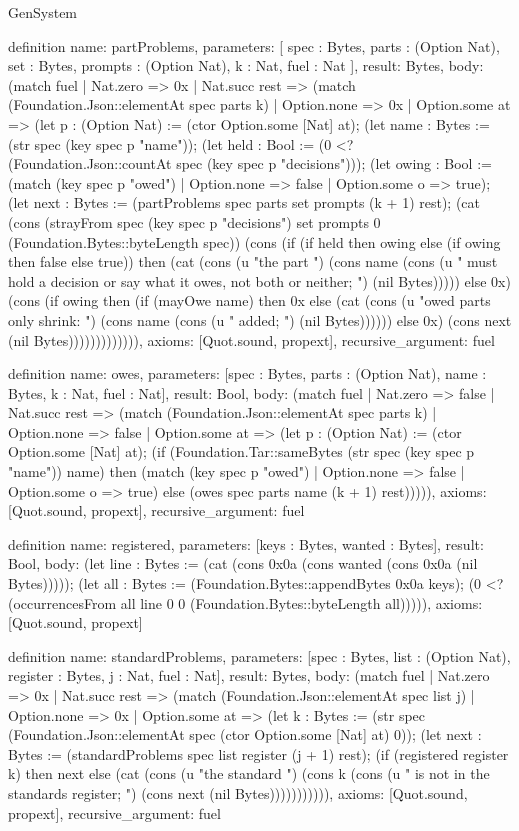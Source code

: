 \begin{lexlean}{GenSystem}
\begin{semanticmodule}
{definition{
  name: partProblems,
  parameters: [
    spec : Bytes,
    parts : (Option Nat),
    set : Bytes,
    prompts : (Option Nat),
    k : Nat,
    fuel : Nat
  ],
  result: Bytes,
  body: (match fuel
    | Nat.zero => 0x
    | Nat.succ rest => (match (Foundation.Json::elementAt spec parts k)
      | Option.none => 0x
      | Option.some at => (let p : (Option Nat) := (ctor Option.some [Nat] at); (let name : Bytes := (str spec (key spec p "name")); (let held : Bool := (0 <? (Foundation.Json::countAt spec (key spec p "decisions"))); (let owing : Bool := (match (key spec p "owed")
        | Option.none => false
        | Option.some o => true); (let next : Bytes := (partProblems spec parts set prompts (k + 1) rest); (cat (cons (strayFrom spec (key spec p "decisions") set prompts 0 (Foundation.Bytes::byteLength spec)) (cons (if (if held then owing else (if owing then false else true)) then (cat (cons (u "the part ") (cons name (cons (u " must hold a decision or say what it owes, not both or neither; ") (nil Bytes))))) else 0x) (cons (if owing then (if (mayOwe name) then 0x else (cat (cons (u "owed parts only shrink: ") (cons name (cons (u " added; ") (nil Bytes)))))) else 0x) (cons next (nil Bytes))))))))))))),
  axioms: [Quot.sound, propext],
  recursive_argument: fuel
}

definition{
  name: owes,
  parameters: [spec : Bytes, parts : (Option Nat), name : Bytes, k : Nat, fuel : Nat],
  result: Bool,
  body: (match fuel
    | Nat.zero => false
    | Nat.succ rest => (match (Foundation.Json::elementAt spec parts k)
      | Option.none => false
      | Option.some at => (let p : (Option Nat) := (ctor Option.some [Nat] at); (if (Foundation.Tar::sameBytes (str spec (key spec p "name")) name) then (match (key spec p "owed")
        | Option.none => false
        | Option.some o => true) else (owes spec parts name (k + 1) rest))))),
  axioms: [Quot.sound, propext],
  recursive_argument: fuel
}

definition{
  name: registered,
  parameters: [keys : Bytes, wanted : Bytes],
  result: Bool,
  body: (let line : Bytes := (cat (cons 0x0a (cons wanted (cons 0x0a (nil Bytes))))); (let all : Bytes := (Foundation.Bytes::appendBytes 0x0a keys); (0 <? (occurrencesFrom all line 0 0 (Foundation.Bytes::byteLength all))))),
  axioms: [Quot.sound, propext]
}

definition{
  name: standardProblems,
  parameters: [spec : Bytes, list : (Option Nat), register : Bytes, j : Nat, fuel : Nat],
  result: Bytes,
  body: (match fuel
    | Nat.zero => 0x
    | Nat.succ rest => (match (Foundation.Json::elementAt spec list j)
      | Option.none => 0x
      | Option.some at => (let k : Bytes := (str spec (Foundation.Json::elementAt spec (ctor Option.some [Nat] at) 0)); (let next : Bytes := (standardProblems spec list register (j + 1) rest); (if (registered register k) then next else (cat (cons (u "the standard ") (cons k (cons (u " is not in the standards register; ") (cons next (nil Bytes))))))))))),
  axioms: [Quot.sound, propext],
  recursive_argument: fuel
}

}
\end{semanticmodule}
\end{lexlean}
